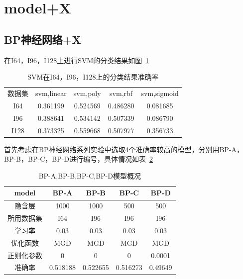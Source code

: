\section{model+X}
\subsection{BP神经网络+X}
在I64，I96，I128上进行SVM的分类结果如图~\ref{table:bpx1}
\begin{table}[htb]
\centering
\caption{SVM在I64，I96，I128上的分类结果准确率}
\begin{tabular}{ccccc}
\toprule[2pt]
数据集 & svm,linear & svm,poly & svm,rbf & svm,sigmoid \\ 
I64 & 0.361199 & 0.524569 & 0.486280 & 0.081685 \\ 
I96 & 0.388641 & 0.534142 & 0.507339 & 0.086790 \\ 
I128 & 0.373325 & 0.559668 & 0.507977 & 0.356733 \\ 
\bottomrule[2pt]
\end{tabular}
\label{table:bpx1}
\end{table} 

首先考虑在BP神经网络系列实验中选取4个准确率较高的模型，分别用BP-A，BP-B，BP-C，BP-D进行编号，具体情况如表~\ref{table:bpx2}
\begin{table}[htb]
\centering
\caption{BP-A,BP-B,BP-C,BP-D模型概况}
\begin{tabular}{ccccc}
\toprule[2pt]
model & BP-A & BP-B & BP-C & BP-D \\ 
\midrule[1pt]
隐含层 & 1000 & 1000 & 500 & 500 \\ 
所用数据集 & I64 & I96 & I96 & I96 \\ 
学习率 & 0.03 & 0.03 & 0.03 & 0.03 \\ 
优化函数 & MGD & MGD & MGD & MGD \\ 
正则化参数 & 0 & 0 & 0 & 0.0001 \\ 
\midrule[1pt]
准确率 & 0.518188 & 0.522655 & 0.516273 & 0.49649 \\ 
\bottomrule[2pt]
\end{tabular} 
\label{table:bpx2}
\end{table}

